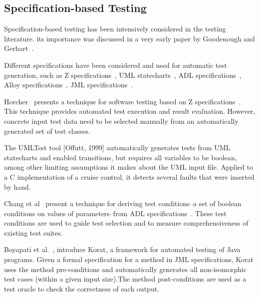 

\subsection{Specification-based Testing}
\label{sec:related-specification}
Specification-based testing has been intensively considered in the testing literature.  its importance was discussed in a very early paper by Goodenough and Gerhart~\cite{Goodenough1975}.

Different specifications have been considered and used for automatic test generation, such as  Z specifications~\cite{Spivey1992,Horcher1995,Stocks1996,Donat1997}, UML statecharts~\cite{Rumbaugh1999,Offutt1999}, ADL specifications~\cite{Sankar1994,Chang1999}, Alloy specifications~\cite{Jackson2002,Khurshid2004,Coppit2005}, JML specifications~\cite{Boyapati2002}.

Horcher~\cite{Horcher1995} presents a technique for software testing based on Z specifications~\cite{Spivey1992}. This technique provides automated test execution and result evaluation. However, concrete input test data need to be selected manually from an
automatically generated set of test classes.

The UMLTest tool [Offutt, 1999] automatically generates tests from UML statecharts and enabled transitions, but requires all variables to be boolean, among other limiting assumptions it makes about the UML input file. Applied to a C implementation of a cruise control, it detects several faults that were inserted by hand. 

Chang et al~\cite{Chang1999} present a technique for deriving test conditions--a set of boolean conditions on values of parameters--from ADL specifications~\cite{Sankar1994}. These test conditions are used to guide test selection and to measure comprehensiveness of existing test suites.

Boyapati et al.~\cite{Boyapati2002}, introduce Korat, a framework for automated testing of Java programs. Given a formal specification for a method in JML specifications, Korat uses the method pre-conditions and automatically generates all non-isomorphic test cases (within a given input size).The method post-conditions are used as a test oracle to check the correctness of each output.

